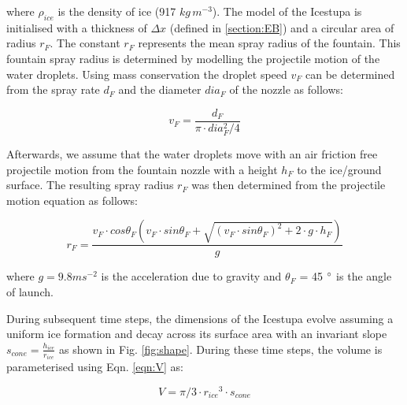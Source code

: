 \documentclass[utf8]{frontiersSCNS} %
\begin{document}
where $\rho_{ice}$ is the density of ice (917 $kg\, m^{-3}$). The model of the Icestupa is initialised with a
thickness of $\Delta x$ (defined in \ref{section:EB}) and a circular area of radius $r_F$. The constant $r_F$
represents the mean spray radius of the fountain.  This fountain spray radius is determined by modelling the
projectile motion of the water droplets. Using mass conservation the droplet speed $v_F$ can be determined from the
spray rate $d_F$ and the diameter $dia_F$ of the nozzle as follows:

\begin{equation} v_F = \frac{d_F}{\pi \cdot dia_F^2/4} \end{equation}

Afterwards, we assume that the water droplets move with an air friction free projectile motion from the fountain
nozzle with a height $h_F$ to the ice/ground surface. The resulting spray radius $r_F$ was then determined from the
projectile motion equation as follows:

\begin{equation} r_F = \frac{v_F \cdot cos\theta_F (v_F \cdot sin\theta_F + \sqrt{(v_F \cdot sin\theta_F)^{2} + 2
\cdot g \cdot h_F})}{g} \end{equation}

where $g = 9.8 m s^{-2}$ is the acceleration due to gravity and $\theta_F$ = 45 $\degree$ is the angle of launch.

During subsequent time steps, the dimensions of the Icestupa evolve assuming a uniform ice formation and decay across
its surface area with an invariant slope $s_{cone} = \frac{h_{ice}}{r_{ice}}$ as shown in Fig.  \ref{fig:shape}.
During these time steps, the volume is parameterised using Eqn. \ref{eqn:V} as:

\begin{equation} V = \pi/3 \cdot {r_{ice}}^3 \cdot s_{cone} \label{eqn:V2} \end{equation}
\end{document}
